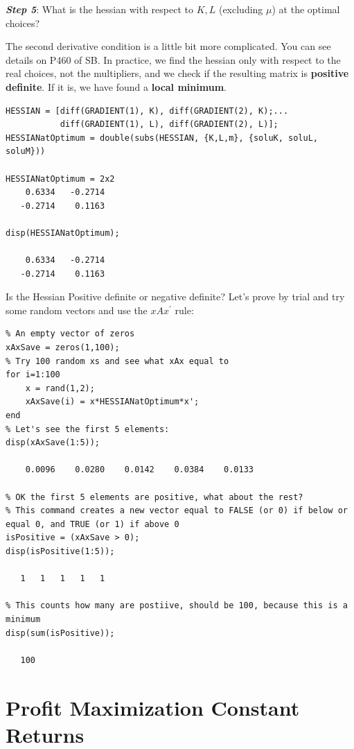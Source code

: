 \documentclass[
]{book}
\begin{document}
\textbf{\emph{Step 5}}: What is the hessian with respect to \(K,L\) (excluding
\(\mu\)) at the optimal choices?

The second derivative condition is a little bit more complicated. You
can see details on P460 of SB. In practice, we find the hessian only
with respect to the real choices, not the multipliers, and we check if
the resulting matrix is \textbf{positive definite}. If it is, we have found a
\textbf{local minimum}.

\begin{verbatim}
HESSIAN = [diff(GRADIENT(1), K), diff(GRADIENT(2), K);...
           diff(GRADIENT(1), L), diff(GRADIENT(2), L)];
HESSIANatOptimum = double(subs(HESSIAN, {K,L,m}, {soluK, soluL, soluM}))

HESSIANatOptimum = 2x2    
    0.6334   -0.2714
   -0.2714    0.1163

disp(HESSIANatOptimum);

    0.6334   -0.2714
   -0.2714    0.1163
\end{verbatim}

Is the Hessian Positive definite or negative definite? Let's prove by
trial and try some random vectors and use the \(xAx^{\prime }\) rule:

\begin{verbatim}
% An empty vector of zeros
xAxSave = zeros(1,100);
% Try 100 random xs and see what xAx equal to    
for i=1:100
    x = rand(1,2);
    xAxSave(i) = x*HESSIANatOptimum*x';
end
% Let's see the first 5 elements:
disp(xAxSave(1:5));

    0.0096    0.0280    0.0142    0.0384    0.0133

% OK the first 5 elements are positive, what about the rest?
% This command creates a new vector equal to FALSE (or 0) if below or equal 0, and TRUE (or 1) if above 0
isPositive = (xAxSave > 0);
disp(isPositive(1:5));

   1   1   1   1   1

% This counts how many are postiive, should be 100, because this is a minimum
disp(sum(isPositive));

   100
\end{verbatim}

\hypertarget{profit-maximization-constant-returns}{%
\section{Profit Maximization Constant Returns}\label{profit-maximization-constant-returns}}
\end{document}

